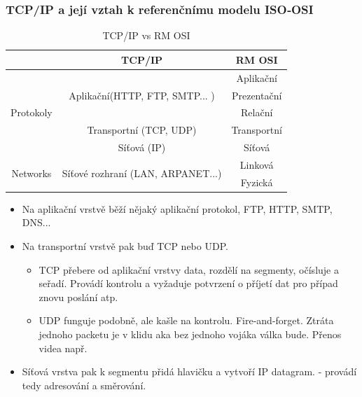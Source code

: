\documentclass[10pt,a4paper]{article}
\begin{document}
\subsubsection{TCP/IP a její vztah k referenčnímu modelu ISO‐OSI}
\begin{table}[ht]
\centering
\begin{tabular}{|c|c|c|}
\hline
                           & TCP/IP                                             & RM OSI      \\
\hline
\multirow{5}{*}{Protokoly} & \multirow{3}{*}{Aplikační(HTTP, FTP, SMTP... )}    & Aplikační   \\
                           &                                                    & Prezentační \\
                           &                                                    & Relační     \\
                           & Transportní (TCP, UDP)                             & Transportní \\
                           & Síťová (IP)                                        & Síťová      \\
\hline
\multirow{2}{*}{Networks}  & \multirow{2}{*}{Síťové rozhraní (LAN, ARPANET...)} & Linková     \\
                           &                                                    & Fyzická    \\
\hline
\end{tabular}
\caption{TCP/IP vs RM OSI}
\label{tab:tcpipvsosi}
\end{table}


\begin{itemize}
\item Na aplikační vrstvě běží nějaký aplikační protokol, FTP, HTTP, SMTP, DNS...
\item Na transportní vrstvě pak buď TCP nebo UDP.
\begin{itemize}
\item TCP přebere od aplikační vrstvy data, rozdělí na segmenty, očísluje a seřadí. Provádí kontrolu a vyžaduje potvrzení o příjetí dat pro případ znovu poslání atp.
\item UDP funguje podobně, ale kašle na kontrolu. Fire-and-forget. Ztráta jednoho packetu je v klidu aka bez jednoho vojáka válka bude. Přenos videa např.
\end{itemize}
\item Síťová vrstva pak k segmentu přidá hlavičku a vytvoří IP datagram. - provádí tedy adresování a směrování.
\end{itemize}
\end{document}
